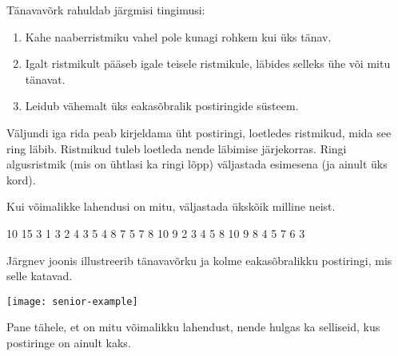 ﻿\documentclass{boi2014-et}
\begin{document}
    Tänavavõrk rahuldab järgmisi tingimusi:
    \begin{enumerate}
        \item Kahe naaberristmiku vahel pole kunagi rohkem kui üks tänav.
        \item Igalt ristmikult pääseb igale teisele ristmikule,
            läbides selleks ühe või mitu tänavat.
        \item Leidub vähemalt üks eakasõbralik postiringide süsteem.
    \end{enumerate}

    \Output

    Väljundi iga rida peab kirjeldama üht postiringi, loetledes ristmikud,
    mida see ring läbib. Ristmikud tuleb loetleda nende läbimise järjekorras.
    Ringi algusristmik (mis on ühtlasi ka ringi lõpp) väljastada esimesena
    (ja ainult üks kord).

    Kui võimalikke lahendusi on mitu, väljastada ükskõik milline neist.

    \Example

    \example
    {
        10 15  3  1 3  2 4  3 5  4 8  7  5 7  8  10  9
    }
    {
        2 3 4 5 8 10 9  8 4  5 7 6 3
    }
    {
        Järgnev joonis illustreerib tänavavõrku ja kolme eakasõbralikku
        postiringi, mis selle katavad.

        \texttt{[image: senior-example]}

        Pane tähele, et on mitu võimalikku lahendust, nende hulgas ka
        selliseid, kus postiringe on ainult kaks.
    }
\end{document}
